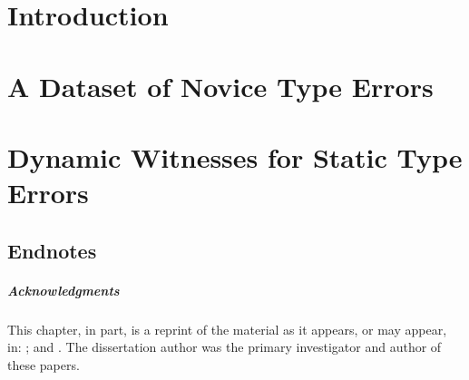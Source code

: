 \documentclass[11pt]{ucsddissertation}
\theoremstyle{plain}%
\theoremstyle{definition}
\begin{document}


\lstMakeShortInline{|}

\chapter{Introduction}
\label{chp:intro}


\chapter{A Dataset of Novice Type Errors}
\label{chp:data-collection}


\chapter{Dynamic Witnesses for Static Type Errors}
\label{chp:nanomaly}
\newcommand\toolname{\tool{NanoMaLy}}






\section*{Endnotes}
\paragraph{Acknowledgments}
  This chapter, in part, is a reprint of the material
  as it appears, or may appear, in:
  ; and
  .
  The dissertation author was the primary investigator and author of
  these papers.
\end{document}
